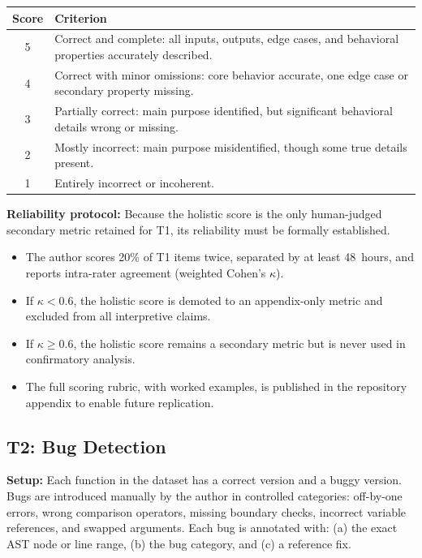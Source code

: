 \documentclass[11pt]{article}
\begin{document}
\begin{longtable}{@{}cp{10cm}@{}}
  \toprule
  \textbf{Score} & \textbf{Criterion} \\
  \midrule
  \endfirsthead
  5 & Correct and complete: all inputs, outputs, edge cases, and
      behavioral properties accurately described. \\
  4 & Correct with minor omissions: core behavior accurate, one
      edge case or secondary property missing. \\
  3 & Partially correct: main purpose identified, but significant
      behavioral details wrong or missing. \\
  2 & Mostly incorrect: main purpose misidentified, though some
      true details present. \\
  1 & Entirely incorrect or incoherent. \\
  \bottomrule
\end{longtable}

\textbf{Reliability protocol:}  Because the holistic score is the only
human-judged secondary metric retained for T1, its reliability must be
formally established.
\begin{itemize}[nosep]
  \item The author scores 20\% of T1 items twice, separated by at
        least 48~hours, and reports intra-rater agreement (weighted
        Cohen's $\kappa$).
  \item If $\kappa < 0.6$, the holistic score is demoted to an
        appendix-only metric and excluded from all interpretive claims.
  \item If $\kappa \geq 0.6$, the holistic score remains a secondary
        metric but is never used in confirmatory analysis.
  \item The full scoring rubric, with worked examples, is published in
        the repository appendix to enable future replication.
\end{itemize}

\subsection*{T2: Bug Detection}

\textbf{Setup:}  Each function in the dataset has a correct version and
a buggy version.  Bugs are introduced manually by the author in
controlled categories: off-by-one errors, wrong comparison operators,
missing boundary checks, incorrect variable references, and swapped
arguments.  Each bug is annotated with: (a) the exact AST node or line
range, (b) the bug category, and (c) a reference fix.
\end{document}
